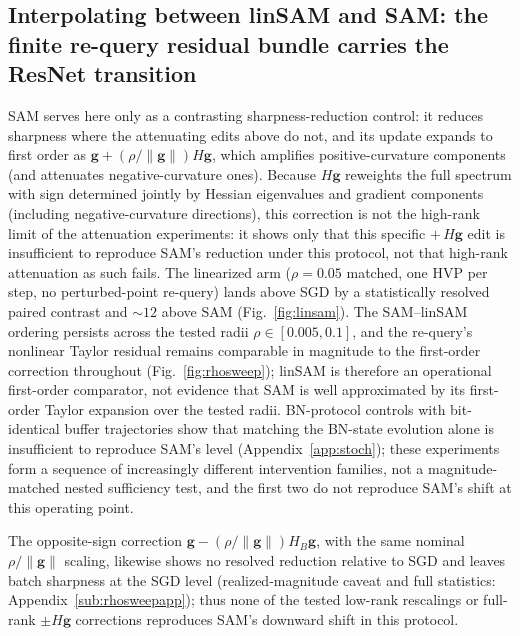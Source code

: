 \documentclass{article}
\theoremstyle{plain}
\theoremstyle{definition}
\theoremstyle{remark}
\begin{document}
\FloatBarrier{}

\subsection{Interpolating between linSAM and SAM: the finite re-query
residual bundle carries the ResNet transition}
\label{sub:sammech}
\label{par:rhosweep}
SAM serves here only as a contrasting sharpness-reduction control: it
reduces sharpness where the attenuating edits above do
not, and its update
expands to first order as $\mathbf{g}+(\rho/\|\mathbf{g}\|)H\mathbf{g}$,
which amplifies positive-curvature components (and attenuates
negative-curvature ones). Because $H\mathbf{g}$ reweights the full
spectrum with sign determined jointly by Hessian eigenvalues and
gradient components (including negative-curvature directions), this
correction is not the high-rank limit of the attenuation
experiments: it shows only that this specific $+\,H\mathbf{g}$ edit
is insufficient to reproduce SAM's reduction under this
protocol, not that high-rank attenuation as such fails. The
linearized arm ($\rho{=}0.05$ matched, one HVP per step, no
perturbed-point re-query) lands above SGD by a statistically
resolved paired contrast and ${\sim}12$ above
SAM (Fig.~\ref{fig:linsam}).
The SAM--linSAM
ordering persists across the tested radii $\rho\in[0.005,0.1]$, and
the re-query's nonlinear Taylor
residual remains comparable in magnitude to the
first-order correction throughout (Fig.~\ref{fig:rhosweep}); linSAM
is therefore an operational first-order comparator, not
evidence that SAM is well approximated by its first-order Taylor
expansion over the tested radii. BN-protocol controls with
bit-identical buffer trajectories show that matching the BN-state
evolution alone is insufficient to reproduce SAM's
level (Appendix~\ref{app:stoch}); these experiments form a sequence
of increasingly different intervention families, not a
magnitude-matched nested sufficiency test, and the first two do not
reproduce SAM's shift at this operating point.

The opposite-sign correction
$\mathbf{g}-(\rho/\|\mathbf{g}\|)H_{B}\mathbf{g}$, with the same
nominal $\rho/\|\mathbf{g}\|$ scaling, likewise shows no resolved
reduction relative to SGD and leaves batch sharpness at the SGD level
(realized-magnitude caveat and full statistics:
Appendix~\ref{sub:rhosweepapp}); thus none of the tested low-rank
rescalings or full-rank $\pm H\mathbf{g}$ corrections reproduces
SAM's downward shift in this protocol.
\end{document}
